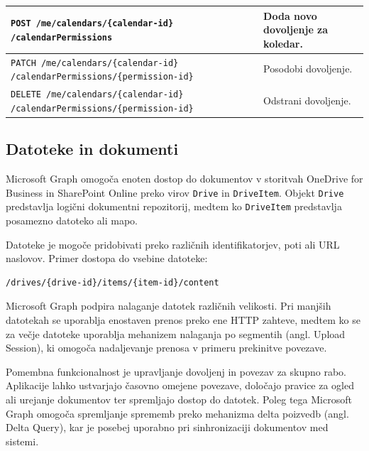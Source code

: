\documentclass[a4paper, 12pt]{book}
\begin{document}
\begin{longtable}{|p{7cm}|p{7.5cm}|}
\texttt{POST /me/calendars/\{calendar-id\}
/calendarPermissions} &
Doda novo dovoljenje za koledar. \\
\hline

\texttt{PATCH /me/calendars/\{calendar-id\}
/calendarPermissions/\{permission-id\}} &
Posodobi dovoljenje. \\
\hline

\texttt{DELETE /me/calendars/\{calendar-id\}
/calendarPermissions/\{permission-id\}} &
Odstrani dovoljenje. \\
\hline

\end{longtable}

\subsection{Datoteke in dokumenti}

Microsoft Graph omogoča enoten dostop do dokumentov v storitvah OneDrive for Business in SharePoint Online preko virov \texttt{Drive} in \texttt{DriveItem}. Objekt \texttt{Drive} predstavlja logični dokumentni repozitorij, medtem ko \texttt{DriveItem} predstavlja posamezno datoteko ali mapo.

Datoteke je mogoče pridobivati preko različnih identifikatorjev, poti ali URL naslovov. Primer dostopa do vsebine datoteke:

\begin{verbatim}
/drives/{drive-id}/items/{item-id}/content
\end{verbatim}

Microsoft Graph podpira nalaganje datotek različnih velikosti. Pri manjših datotekah se uporablja enostaven prenos preko ene HTTP zahteve, medtem ko se za večje datoteke uporablja mehanizem nalaganja po segmentih (angl. Upload Session), ki omogoča nadaljevanje prenosa v primeru prekinitve povezave.

Pomembna funkcionalnost je upravljanje dovoljenj in povezav za skupno rabo. Aplikacije lahko ustvarjajo časovno omejene povezave, določajo pravice za ogled ali urejanje dokumentov ter spremljajo dostop do datotek. Poleg tega Microsoft Graph omogoča spremljanje sprememb preko mehanizma delta poizvedb (angl. Delta Query), kar je posebej uporabno pri sinhronizaciji dokumentov med sistemi.
\end{document}

